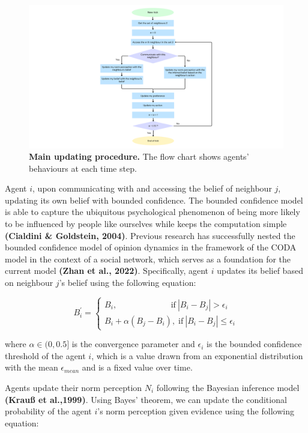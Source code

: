 \documentclass[
  11pt,
]{article}
\begin{document}
\begin{figure}[h]
  \centering
  \includegraphics[width=0.7\columnwidth]{./figures/diss_flow_chart.pdf}
  \caption{\textbf{Main updating procedure.} The flow chart shows agents' behaviours at each time step.}
  \label{fig:1}
\end{figure}

Agent \(i\), upon communicating with and accessing the belief of
neighbour \(j\), updating its own belief with bounded confidence. The
bounded confidence model is able to capture the ubiquitous psychological
phenomenon of being more likely to be influenced by people like
ourselves while keeps the computation simple \textbf{(Cialdini \&
Goldstein, 2004)}. Previous research has successfully nested the bounded
confidence model of opinion dynamics in the framework of the CODA model
in the context of a social network, which serves as a foundation for the
current model \textbf{(Zhan et al., 2022)}. Specifically, agent \(i\)
updates its belief based on neighbour \(j\)'s belief using the following
equation:

\begin{equation}
    B_i^{\prime} = \begin{cases}
        B_i, \;\;\;\;\;\;\;\;\;\;\;\;\;\;\;\;\;\;\;\;\;\;\; \text{if} \: |B_i - B_j| > \epsilon_i \\
        B_i + \alpha (B_j - B_i), \; \text{if} \: |B_i - B_j| \le \epsilon_i
    \end{cases}
\end{equation}

where \(\alpha \in (0,0.5]\) is the convergence parameter and
\(\epsilon_i\) is the bounded confidence threshold of the agent \(i\),
which is a value drawn from an exponential distribution with the mean
\(\epsilon_{mean}\) and is a fixed value over time.

Agents update their norm perception \(N_i\) following the Bayesian
inference model \textbf{(Krauß et al.,1999)}. Using Bayes' theorem, we
can update the conditional probability of the agent \(i\)'s norm
perception given evidence using the following equation:
\end{document}
